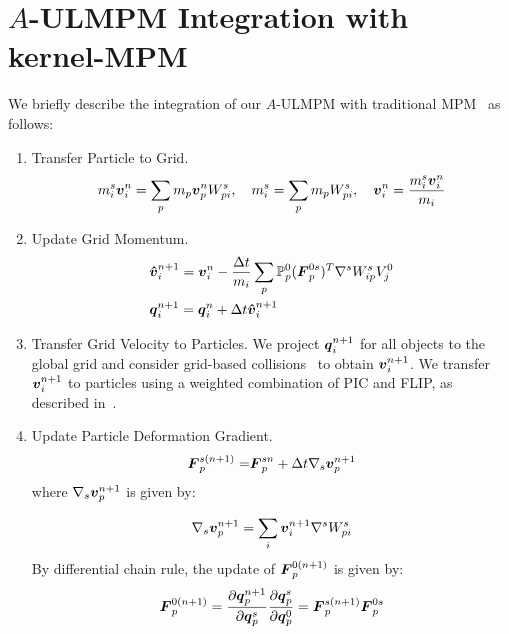 \section{$A$-ULMPM Integration with kernel-MPM}
\label{sec:A-ULMPM-kernel}
We briefly describe the integration of our $A$-ULMPM with traditional MPM~\cite{Stomakhin:2013:MPMsnow} as follows:
\begin{enumerate}
\item{Transfer Particle to Grid.}
\begin{equation}
    m_i^s \boldsymbol{v}_i^n=\sum_p m_p \boldsymbol{v}_p^n W_{pi}^s,\quad m_i^s=\sum_p m_p W_{pi}^s,\quad \boldsymbol{v}_i^n= \frac{m_i^s \boldsymbol{v}_i^n}{m_i}
\end{equation}
\item{Update Grid Momentum.} 
\begin{equation}
\begin{split}
    &\boldsymbol{\hat{v}}_i^{n+1}=\boldsymbol{v}_i^n-\frac{\Delta t}{m_i}\sum_p\mathbb{P}_p^0(\boldsymbol{F}_p^{0s})^T \nabla^sW_{ip}^s V_j^0\\
    &\boldsymbol{q}_i^{n+1}=\boldsymbol{q}_i^n+\Delta t\boldsymbol{\hat{v}}_i^{n+1}\\
\end{split}
\label{eq:kernel_grid_Vel_update_explicit}
\end{equation}
\item{Transfer Grid Velocity to Particles.} 
We project $\boldsymbol{q}_i^{n+1}$ for all objects to the global grid and consider grid-based collisions~\cite{Stomakhin:2013:MPMsnow} to obtain $\boldsymbol{v}_i^{n+1}$. We transfer $\boldsymbol{v}_i^{n+1}$ to particles using a weighted combination of PIC and FLIP, as described in~\cite{Stomakhin:2013:MPMsnow}. 
\item{Update Particle Deformation Gradient.}
\begin{eqnarray}
  \boldsymbol{F}_p^{s(n+1)}=    &\boldsymbol{F}_p^{sn}+\Delta t\nabla_s\boldsymbol{v}_p^{n+1}\\
\label{eq:kernel_gradient_s(n+1)}
\end{eqnarray}
where $\nabla_s\boldsymbol{v}_p^{n+1}$ is given by:

\begin{equation}
\nabla_s\boldsymbol{v}_p^{n+1}=\sum_i\boldsymbol{v}_i^{n+1} \nabla^sW_{pi}^s
\label{eq:kernelgradientVp}
\end{equation}
By differential chain rule, the update of $\boldsymbol{F}_p^{0(n+1)}$ is given by:
\begin{equation}
    \boldsymbol{F}_p^{0(n+1)}=\frac{\partial \boldsymbol{q}_p^{n+1}}{\partial\boldsymbol{q}_p^{s}}\frac{\partial\boldsymbol{q}_p^{s}}{\partial\boldsymbol{q}_p^{0}}
    =\boldsymbol{F}_p^{s(n+1)}\boldsymbol{F}_p^{0s}
\end{equation}
\end{enumerate}

